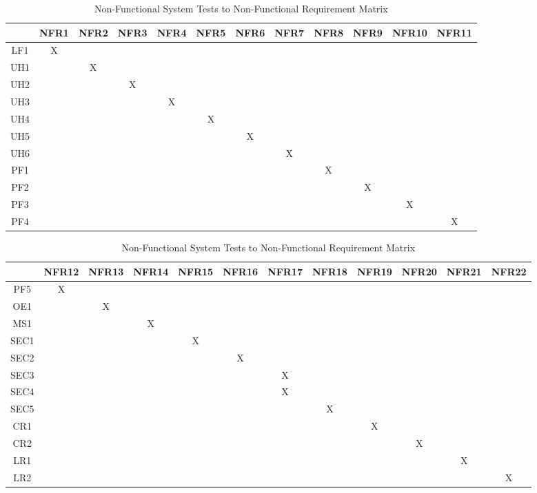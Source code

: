\documentclass[12pt, titlepage]{article}
\begin{document}
\begin{table}[h!]
	\begin{adjustwidth}{-3cm}{-5cm}
		\begin{tabular}{|c|c|c|c|c|c|c|c|c|c|c|c|}
			\hline
			& NFR1 & NFR2 & NFR3 & NFR4 & NFR5 & NFR6 & NFR7 & NFR8 & NFR9 & NFR10 & NFR11 \\ \hline
			LF1 &X & & & & & & & & & & \\ \hline
			UH1 & &X & & & & & & & & & \\ \hline
			UH2 & & &X & & & & & & & & \\ \hline
			UH3 & & & &X & & & & & & & \\ \hline 
			UH4 & & & & &X & & & & & & \\ \hline 
			UH5 & & & & & &X & & & & & \\ \hline 
			UH6 & & & & & & &X & & & & \\ \hline 
			PF1 & & & & & & & &X & & & \\ \hline 
			PF2 & & & & & & & & &X & & \\ \hline 
			PF3 & & & & & & & & & &X & \\ \hline
			PF4 & & & & & & & & & & &X \\ \hline  
		\end{tabular}
		\caption{Non-Functional System Tests to Non-Functional Requirement Matrix}
		\label{Table:R_trace}
		
				\begin{tabular}{|c|c|c|c|c|c|c|c|c|c|c|c|}
			\hline
			& NFR12 & NFR13 & NFR14 & NFR15 & NFR16 & NFR17 & NFR18 & NFR19 & NFR20 & NFR21 & NFR22 \\ \hline
			PF5 &X & & & & & & & & & & \\ \hline
			OE1 & &X & & & & & & & & & \\ \hline
			MS1 & & &X & & & & & & & & \\ \hline
			SEC1 & & & &X & & & & & & & \\ \hline 
			SEC2 & & & & &X & & & & & & \\ \hline 
			SEC3 & & & & & &X & & & & & \\ \hline 
			SEC4 & & & & & &X & & & & & \\ \hline 
			SEC5 & & & & & & &X & & & & \\ \hline 
			CR1 & & & & & & & &X & & & \\ \hline 
			CR2 & & & & & & & & &X & & \\ \hline 
			LR1 & & & & & & & & & &X & \\ \hline 
			LR2 & & & & & & & & & & &X \\ \hline 
		\end{tabular}
		\caption{Non-Functional System Tests to Non-Functional Requirement Matrix}
		\label{Table:R_trace}
	\end{adjustwidth}
	\end{table}
\end{document}
